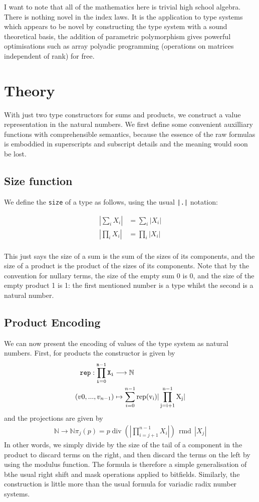\documentclass{article}
\DeclareMathOperator{\quot}{div}
\DeclareMathOperator{\rmd}{rmd}
\begin{document}
I want to note that all of the mathematics here is trivial high school
algebra. There is nothing novel in the index laws. It is the application
to type systems which appears to be novel by constructing the type
system with a sound theoretical basis, the addition of parametric
polymorphism gives powerful optimisations such as array polyadic
programming (operations on matrices independent of rank) for free.


\section{Theory}
With just two type constructors for sums and products, we construct a value
representation in the natural numbers. We first define some convenient 
auxilliary functions with comprehensible semantics, because the essence
of the raw formulas is emboddied in superscripts and subscript details
and the meaning would soon be lost.

\subsection{Size function}
We define the \verb$size$ of a type as follows, using the usual \verb$|.|$ notation:

\begin{align*}
|\sum_iX_i| &= \sum_i|X_i|\\
|\prod_iX_i| &= \prod_i|X_i|\\
\end{align*}

This just says the size of a sum is the sum of the sizes of its components,
and the size of a product is the product of the sizes of its components.
Note that by the convention for nullary terms, the size of the empty sum 0
is 0, and the size of the empty product 1 is 1: the first mentioned number
is a type whilst the second is a natural number.

\subsection{Product Encoding}
We can now present the encoding of values of the type system as natural numbers.
First, for products the constructor is given by
\begin{align*}
\tt{rep}: \prod_{i=0}^{n-1}X_i &\longrightarrow \mathbb{N}\\
(v0, ... ,v_{n-1}) &\mapsto \sum_{i=0}^{n-1}\rm{rep}(v_i) | \prod_{j=i+1}^{n-1} X_j|
\end{align*}
and the projections are given by
\begin{align*}
\mathbb{N} \longrightarrow \mathbb{N}
\pi_j (p) = p \quot (|\prod_{i=j+1}^{n-1}X_i|) \, \rmd \, |X_j|
\end{align*}
In other words, we simply divide by the size of the tail of a component
in the product to discard terms on the right, and then discard the terms
on the left by using the modulus function.  The formula is therefore
a simple generalisation of bthe usual right shift and mask operations
applied to bitfields. Similarly, the construction is little more
than the usual formula for variadic radix number systems.
\end{document}
